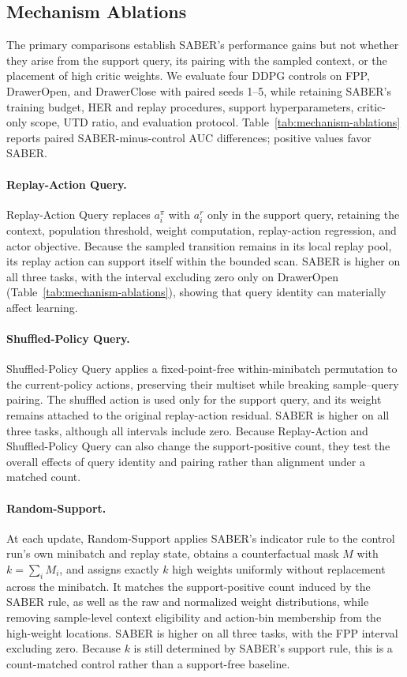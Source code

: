 \documentclass[letterpaper]{article}
\begin{document}
\subsection{Mechanism Ablations}

The primary comparisons establish SABER's performance gains but not whether they arise from the support query, its pairing with the sampled context, or the placement of high critic weights. We evaluate four DDPG controls on FPP, DrawerOpen, and DrawerClose with paired seeds 1--5, while retaining SABER's training budget, HER and replay procedures, support hyperparameters, critic-only scope, UTD ratio, and evaluation protocol. Table~\ref{tab:mechanism-ablations} reports paired SABER-minus-control AUC differences; positive values favor SABER.

\paragraph{Replay-Action Query.}
Replay-Action Query replaces \(a_i^\pi\) with \(a_i^r\) only in the support query, retaining the context, population threshold, weight computation, replay-action regression, and actor objective. Because the sampled transition remains in its local replay pool, its replay action can support itself within the bounded scan. SABER is higher on all three tasks, with the interval excluding zero only on DrawerOpen (Table~\ref{tab:mechanism-ablations}), showing that query identity can materially affect learning.

\paragraph{Shuffled-Policy Query.}
Shuffled-Policy Query applies a fixed-point-free within-minibatch permutation to the current-policy actions, preserving their multiset while breaking sample--query pairing. The shuffled action is used only for the support query, and its weight remains attached to the original replay-action residual. SABER is higher on all three tasks, although all intervals include zero. Because Replay-Action and Shuffled-Policy Query can also change the support-positive count, they test the overall effects of query identity and pairing rather than alignment under a matched count.

\paragraph{Random-Support.}
At each update, Random-Support applies SABER's indicator rule to the control run's own minibatch and replay state, obtains a counterfactual mask $M$ with $k=\sum_i M_i$, and assigns exactly $k$ high weights uniformly without replacement across the minibatch. It matches the support-positive count induced by the SABER rule, as well as the raw and normalized weight distributions, while removing sample-level context eligibility and action-bin membership from the high-weight locations. SABER is higher on all three tasks, with the FPP interval excluding zero. Because $k$ is still determined by SABER's support rule, this is a count-matched control rather than a support-free baseline.
\end{document}
